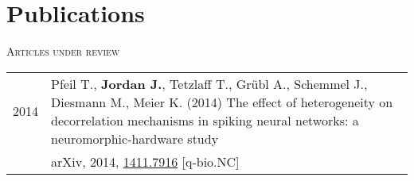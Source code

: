 \documentclass[a4paper,10pt]{article}
\begin{document}
\section{Publications}
\textsc{Articles under review}\\[.5em]
\begin{tabular}{>{\hfill}p{1.6cm} p{}}
  2014 & Pfeil T., \textbf{Jordan J.}, Tetzlaff T., Gr\"ubl A., Schemmel J., Diesmann M., Meier K. (2014) The effect of heterogeneity on decorrelation mechanisms in spiking neural networks: a neuromorphic-hardware study \\
  & \footnotesize arXiv, 2014, \href{http://arxiv.org/abs/1411.7916}{1411.7916} [q-bio.NC]
\end{tabular} \\[1em]

\newpage
\end{document}
